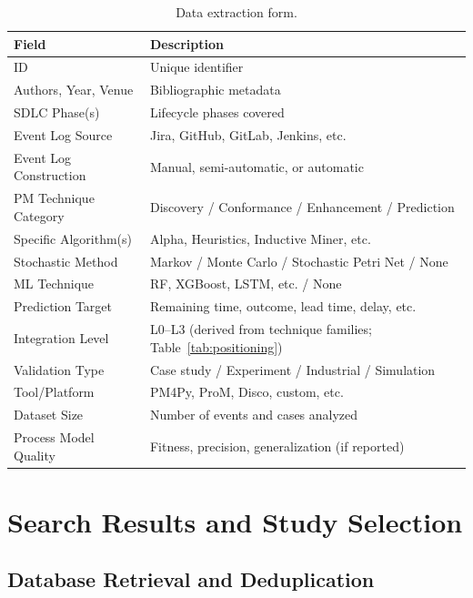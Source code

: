 \begin{table}[htbp]
\centering
\caption{Data extraction form.}
\label{tab:extraction}
\small
\setlength{\tabcolsep}{4pt}
\begin{tabular}{p{3.6cm} p{8.1cm}}
\toprule
\textbf{Field} & \textbf{Description} \\
\midrule
ID                           & Unique identifier \\
Authors, Year, Venue         & Bibliographic metadata \\
SDLC Phase(s)                & Lifecycle phases covered \\
Event Log Source             & Jira, GitHub, GitLab, Jenkins, etc. \\
Event Log Construction       & Manual, semi-automatic, or automatic \\
PM Technique Category        & Discovery / Conformance / Enhancement / Prediction \\
Specific Algorithm(s)        & Alpha, Heuristics, Inductive Miner, etc. \\
Stochastic Method            & Markov / Monte Carlo / Stochastic Petri Net / None \\
ML Technique                 & RF, XGBoost, LSTM, etc. / None \\
Prediction Target            & Remaining time, outcome, lead time, delay, etc. \\
Integration Level            & L0--L3 (derived from technique families; Table~\ref{tab:positioning}) \\
Validation Type              & Case study / Experiment / Industrial / Simulation \\
Tool/Platform                & PM4Py, ProM, Disco, custom, etc. \\
Dataset Size                 & Number of events and cases analyzed \\
Process Model Quality        & Fitness, precision, generalization (if reported) \\
\bottomrule
\end{tabular}
\end{table}


\section{Search Results and Study Selection}
\label{sec:slr-results-selection}

\subsection{Database Retrieval and Deduplication}

